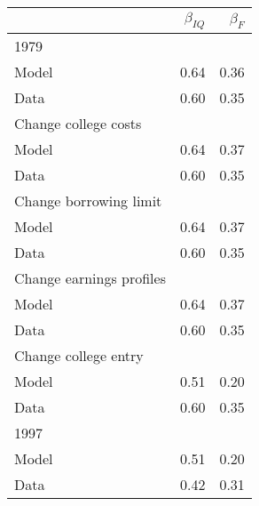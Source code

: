 \begin{tabular}{lrr}
\hline
  & $\beta_{IQ}$  & $\beta_{F}$  \\ 
\hline
1979 &   &   \\ 
Model & 0.64  & 0.36  \\ 
Data & 0.60  & 0.35  \\ 
Change college costs &   &   \\ 
Model & 0.64  & 0.37  \\ 
Data & 0.60  & 0.35  \\ 
Change borrowing limit &   &   \\ 
Model & 0.64  & 0.37  \\ 
Data & 0.60  & 0.35  \\ 
Change earnings profiles &   &   \\ 
Model & 0.64  & 0.37  \\ 
Data & 0.60  & 0.35  \\ 
Change college entry &   &   \\ 
Model & 0.51  & 0.20  \\ 
Data & 0.60  & 0.35  \\ 
1997 &   &   \\ 
Model & 0.51  & 0.20  \\ 
Data & 0.42  & 0.31  \\ 
\hline
\end{tabular}%
